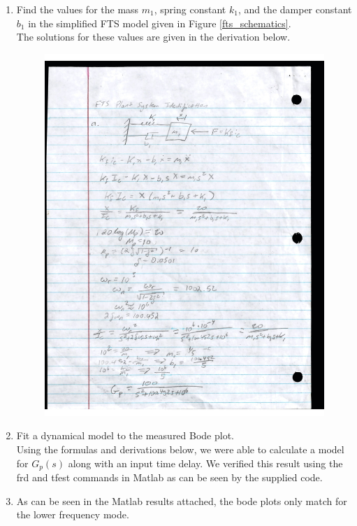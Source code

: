 \documentclass[a4paper, titlepage, 12pt]{article}
\begin{document}
		\begin{enumerate}
			\item Find the values for the mass $m_1$, spring constant $k_1$, and the
			damper constant $b_1$ in the simplified FTS model given in Figure \ref{fts_schematics}. \\
			The solutions for these values are given in the derivation below.
			\begin{figure}[H]
				\centering
				\includegraphics[width=\linewidth]{images/mechanical_derivation.jpg}
			\end{figure}
			\item Fit a dynamical model to the measured Bode plot. \\
			Using the formulas and derivations below, we were able to calculate a model
			for $G_p(s)$ along with an input time delay. We verified this result using
			the frd and tfest commands in Matlab as can be seen by the supplied code.
			\item As can be seen in the Matlab results attached, the bode plots only match
			for the lower frequency mode.
		\end{enumerate}
\end{document}
